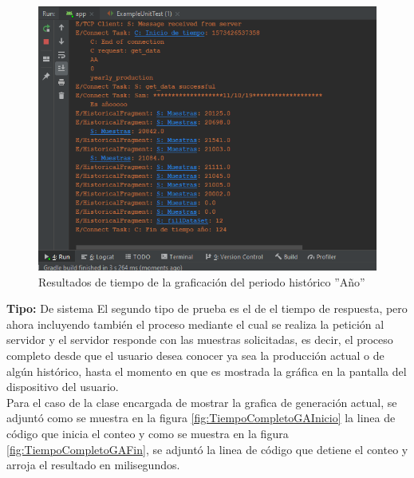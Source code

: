 \begin{figure}[H]
	\centering
	\includegraphics[scale=.6]{Capitulo5/images/TiempoGraficacionAno.png}
	\caption{Resultados de tiempo de la graficación del periodo histórico ''Año''}	\label{fig:Tiempo_GraficacionHAno}
\end{figure} 


\textbf{Tipo: }De sistema \newline
El segundo tipo de prueba es el de el tiempo de respuesta, pero ahora incluyendo también el proceso mediante el cual se realiza la petición al servidor y el servidor responde con las muestras solicitadas, es decir, el proceso completo desde que el usuario desea conocer ya sea la producción actual o de algún histórico, hasta el momento en que es mostrada la gráfica en la pantalla del dispositivo del usuario. \\ \newline
Para el caso de la clase encargada de mostrar la grafica de generación actual, se adjuntó como se muestra en la figura \ref{fig:TiempoCompletoGAInicio} la linea de código que inicia el conteo y como se muestra en la figura \ref{fig:TiempoCompletoGAFin}, se adjuntó la linea de código que detiene el conteo y arroja el resultado en milisegundos.\\ \newline

